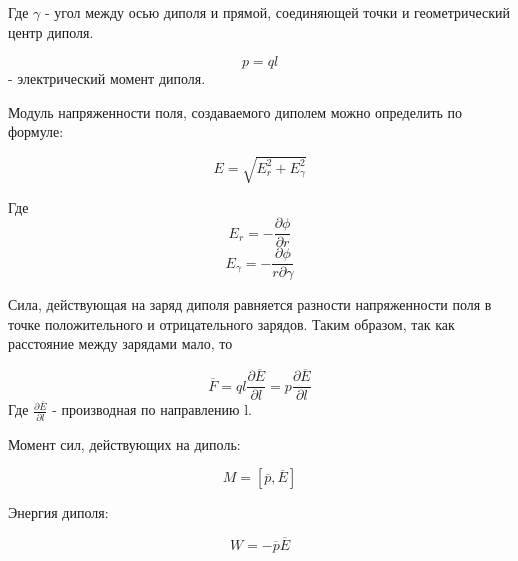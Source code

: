 Где $\gamma$ - угол между осью диполя и прямой, соединяющей точки и геометрический центр диполя.

\[p = ql\]
 - электрический момент диполя.

Модуль напряженности поля, создаваемого диполем можно определить по формуле:

\begin{equation}
E = \sqrt{E_r^2 + E_\gamma^2}
\end{equation}

Где
\[E_r = - \frac{\partial \phi}{\partial r}\]
\[E_\gamma = - \frac{\partial \phi}{r \partial \gamma}\]

Сила, действующая на заряд диполя равняется разности напряженности поля в точке положительного и отрицательного зарядов.
Таким образом, так как расстояние между зарядами мало, то

\begin{equation}
\overline{F} = q l \frac{\partial \overline{E}}{\partial l} = p \frac{\partial \overline{E}}{\partial l}
\end{equation}
Где $\frac{\partial \overline{E}}{\partial l}$ - производная по направлению l.

Момент сил, действующих на диполь:


\begin{equation}
M = [\overline{p},\overline{E}]
\end{equation}

Энергия диполя:

\begin{equation}
W = -\overline{p} \overline{E}
\end{equation}

